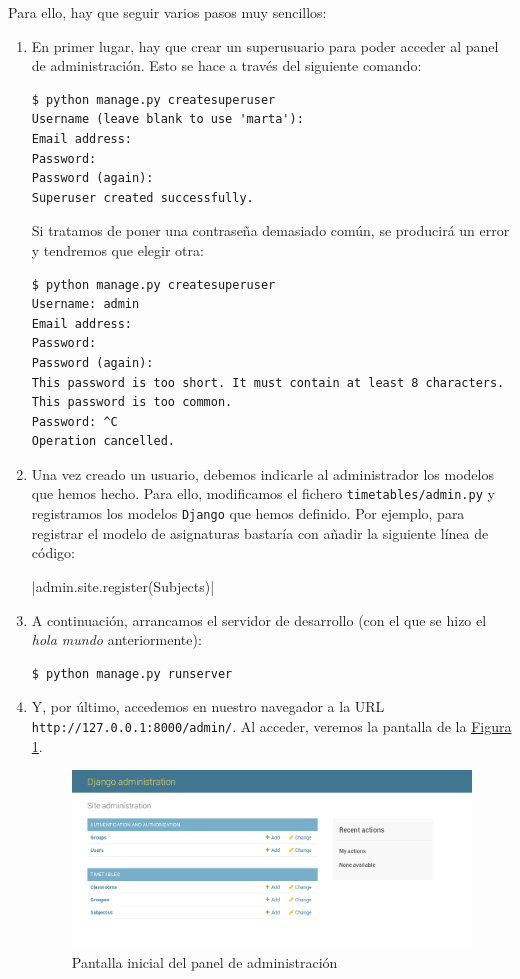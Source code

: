 Para ello, hay que seguir varios pasos muy sencillos:
\begin{enumerate}
\item En primer lugar, hay que crear un superusuario para poder acceder al panel de administración. Esto se hace a través del siguiente comando:

\begin{verbatim}
$ python manage.py createsuperuser       
Username (leave blank to use 'marta'): 
Email address: 
Password: 
Password (again): 
Superuser created successfully.
\end{verbatim}

Si tratamos de poner una contraseña demasiado común, se producirá un error y tendremos que elegir otra:

\begin{verbatim}
$ python manage.py createsuperuser
Username: admin
Email address: 
Password: 
Password (again): 
This password is too short. It must contain at least 8 characters.
This password is too common.
Password: ^C
Operation cancelled.
\end{verbatim}

\item Una vez creado un usuario, debemos indicarle al administrador los modelos que hemos hecho. Para ello, modificamos el fichero \texttt{timetables/admin.py} y registramos los modelos \texttt{Django} que hemos definido. Por ejemplo, para registrar el modelo de asignaturas bastaría con añadir la siguiente línea de código:

|admin.site.register(Subjects)|

\item A continuación, arrancamos el servidor de desarrollo (con el que se hizo el \textit{hola mundo} anteriormente):

\begin{verbatim}
$ python manage.py runserver
\end{verbatim}

\item Y, por último, accedemos en nuestro navegador a la URL \texttt{http://127.0.0.1:8000/admin/}. Al acceder, veremos la pantalla de la \hyperref[djangoadminpanel]{Figura \ref*{djangoadminpanel}}.

\begin{figure}
\centering
\includegraphics[width=\textwidth]{img/djangoadminpanel}
\caption{Pantalla inicial del panel de administración}
\label{djangoadminpanel}
\end{figure}

\end{enumerate} 

